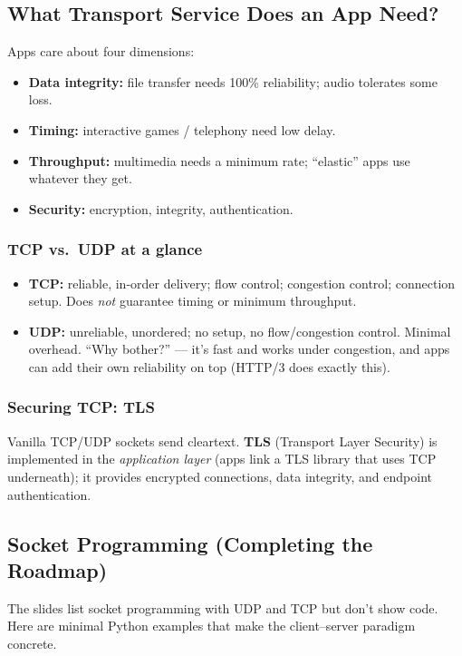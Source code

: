 \documentclass[hidelinks]{article}
\begin{document}
\subsection{What Transport Service Does an App Need?}

Apps care about four dimensions:
\begin{itemize}
    \item \textbf{Data integrity:} file transfer needs 100\% reliability;
    audio tolerates some loss.
    \item \textbf{Timing:} interactive games / telephony need low delay.
    \item \textbf{Throughput:} multimedia needs a minimum rate;
    ``elastic'' apps use whatever they get.
    \item \textbf{Security:} encryption, integrity, authentication.
\end{itemize}

\subsubsection{TCP vs.\ UDP at a glance}
\begin{itemize}
    \item \textbf{TCP:} reliable, in-order delivery; flow control;
    congestion control; connection setup. Does \emph{not} guarantee timing
    or minimum throughput.
    \item \textbf{UDP:} unreliable, unordered; no setup, no flow/congestion
    control. Minimal overhead. ``Why bother?'' --- it's fast and works under
    congestion, and apps can add their own reliability on top (HTTP/3 does
    exactly this).
\end{itemize}

\subsubsection{Securing TCP: TLS}
Vanilla TCP/UDP sockets send cleartext. \textbf{TLS} (Transport Layer
Security) is implemented in the \emph{application layer} (apps link a TLS
library that uses TCP underneath); it provides encrypted connections, data
integrity, and endpoint authentication.

\subsection{Socket Programming (Completing the Roadmap)}

The slides list socket programming with UDP and TCP but don't show code.
Here are minimal Python examples that make the client--server paradigm
concrete.
\end{document}
